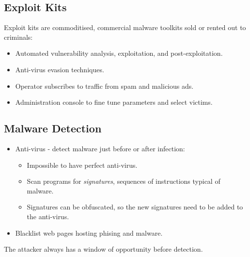 \documentclass[11pt]{article}
\begin{document}
\subsection{Exploit Kits}
Exploit kits are commoditised, commercial malware toolkits sold or rented out to criminals:
\begin{itemize}
  \item Automated vulnerability analysis, exploitation, and post-exploitation.
  \item Anti-virus evasion techniques.
  \item Operator subscribes to traffic from spam and malicious ads.
  \item Administration console to fine tune parameters and select victims.
\end{itemize}

\subsection{Malware Detection}
\begin{itemize}
  \item Anti-virus - detect malware just before or after infection:
    \begin{itemize}
      \item Impossible to have perfect anti-virus.
      \item Scan programs for \textit{signatures}, sequences of instructions typical of malware.
      \item Signatures can be obfuscated, so the new signatures need to be added to the anti-virus.
    \end{itemize}
  \item Blacklist web pages hosting phising and malware.
\end{itemize}

The attacker always has a window of opportunity before detection.
\end{document}
